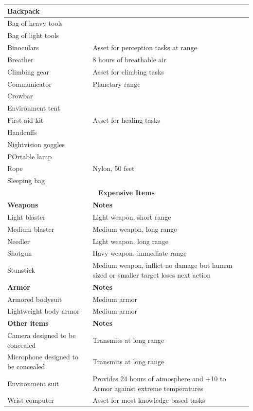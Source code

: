 \begin{longtable}{| p{} | p{} |}
Backpack & \\ \hline
Bag of heavy tools & \\ \hline
Bag of light tools & \\ \hline
Binoculars & Asset for perception tasks at range \\ \hline
Breather & 8 hours of breathable air \\ \hline
Climbing gear & Asset for climbing tasks \\ \hline
Communicator & Planetary range \\ \hline
Crowbar & \\ \hline
Environment tent & \\ \hline
First aid kit & Asset for healing tasks \\ \hline
Handcuffs & \\ \hline
Nightvision goggles & \\ \hline
POrtable lamp & \\ \hline
Rope & Nylon, 50 feet \\ \hline
Sleeping bag & \\ \hline

\multicolumn{2}{|c|}{\textbf{Expensive Items}} \\ \hline

\textbf{Weapons} & \textbf{Notes} \\ \hline
Light blaster & Light weapon, short range \\ \hline
Medium blaster & Medium weapon, long range \\ \hline
Needler & Light weapon, long range \\ \hline
Shotgun & Havy weapon, immediate range \\ \hline
Stunstick & Medium weapon, inflict no damage but human sized or smaller target loses next action \\ \hline

\textbf{Armor} & \textbf{Notes} \\ \hline
Armored bodysuit & Medium armor \\ \hline
Lightweight body armor & Medium armor \\ \hline

\textbf{Other items} & \textbf{Notes} \\ \hline
Camera designed to be concealed & Transmits at long range \\ \hline
Microphone designed to be concealed & Transmits at long range \\ \hline
Environment suit & Provides 24 hours of atmosphere and +10 to Armor against extreme temperatures \\ \hline
Wrist computer & Asset for most knowledge-based tasks \\ \hline


\end{longtable}
